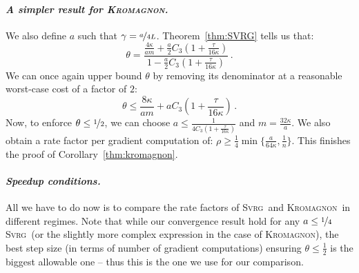 \documentclass[twoside, 11pt]{article}
\newcommand{\stepsize}{\gamma}
\newcommand{\overlap}{\tau}
\newcommand{\contraction}{\rho}
\newcommand{\lipschitz}{L}
\newcommand{\SVRG}{\textsc{Svrg}}
\newcommand{\KROMAGNON}{\textsc{Kromagnon}}
\begin{document}
\paragraph{\textit{A simpler result for \KROMAGNON.}}
We also define $a$ such that $\stepsize = \nicefrac{a}{4 \lipschitz}$.
Theorem~\ref{thm:SVRG} tells us that:
\begin{equation}
\theta = \frac{\frac{4 \kappa}{a m} + \frac{a}{2} C_3 (1 + \frac{\overlap}{16\kappa})}{1 - \frac{a}{2} C_3 (1 + \frac{\overlap}{16\kappa})}\,.
\end{equation}
We can once again upper bound $\theta$ by removing its denominator at a reasonable worst-case cost of a factor of $2$:
\begin{equation}
\theta \leq \frac{8 \kappa}{a m} + a C_3 (1 + \frac{\overlap}{16\kappa}) \,.
\end{equation}
Now, to enforce $\theta \leq \nicefrac{1}{2}$, we can choose $a \leq \frac{1}{4C_3 (1 + \frac{\overlap}{16\kappa})}$ and $m = \frac{32 \kappa}{a}$.
We also obtain a rate factor per gradient computation of: $\contraction \geq \frac{1}{4} \min\{\frac{a}{64\kappa}, \frac{1}{n}\}$.
This finishes the proof of Corollary~\ref{thm:kromagnon}.
\hfill \BlackBox

\paragraph{\textit{Speedup conditions.}}
All we have to do now is to compare the rate factors of \SVRG\ and \KROMAGNON\ in different regimes.
Note that while our convergence result hold for any $a \leq \nicefrac{1}{4}$ \SVRG\ (or the slightly more complex expression in the case of \KROMAGNON), the best step size (in terms of number of gradient computations) ensuring $\theta \leq \frac{1}{2}$ is the biggest allowable one -- thus this is the one we use for our comparison.
\end{document}
